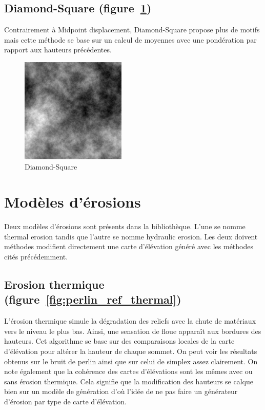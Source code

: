 \subsection{Diamond-Square (figure~\ref{fig:diamond_ref})}
Contrairement à Midpoint displacement, Diamond-Square propose plus de motifs mais cette méthode se 
base sur un calcul de moyennes avec une pondération par rapport aux hauteurs précédentes. 

\begin{figure}[!ht]
    \begin{center}
	\includegraphics[width=5cm]{resources/diamond_ref.png}
         \caption{Diamond-Square}
         \label{fig:diamond_ref}
    \end{center}
\end{figure}

\section{Modèles d'érosions}
Deux modèles d'érosions sont présents dans la bibliothèque. 
L'une se nomme thermal erosion tandis que l'autre se nomme hydraulic erosion.
Les deux doivent méthodes modifient directement une carte d'élévation généré avec les méthodes cités précédemment.

\subsection{Erosion thermique (figure~\ref{fig:perlin_ref_thermal})}
L'érosion thermique simule la dégradation des reliefs avec la chute de matériaux 
vers le niveau le plus bas. Ainsi, une sensation de floue apparaît aux bordures des hauteurs.
Cet algorithme se base sur des comparaisons locales de la carte d'élévation pour altérer la hauteur de chaque sommet.
On peut voir les résultats obtenus sur le bruit de perlin ainsi que sur celui de simplex assez clairement.
On note également que la cohérence des cartes d'élévations sont les mêmes avec ou sans érosion thermique.
Cela signifie que la modification des hauteurs se calque bien sur un modèle de génération
d'où l'idée de ne pas faire un générateur d'érosion par type de carte d'élévation.

